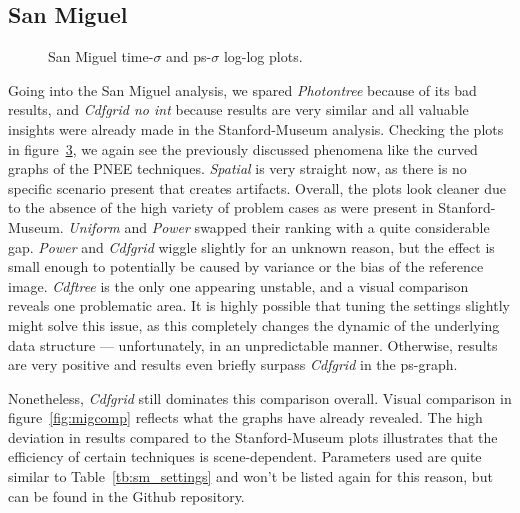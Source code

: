\FloatBarrier
\subsection{San Miguel}

\begin{figure}
    \centering
    \begin{subfigure}{.5\textwidth}
      \centering
        \caption{}
        \label{fig:sanmain_t}
    \end{subfigure}%
    \begin{subfigure}{.5\textwidth}
        \caption{}
        \label{fig:sanmain_ps}
    \end{subfigure}
    \caption{San Miguel time-$\sigma$ and ps-$\sigma$ log-log plots.}
    \label{fig:sanmain}
\end{figure}

Going into the San Miguel analysis, we spared \textit{Photontree} because of its bad results, and \textit{Cdfgrid no int} because results are very similar and all valuable insights were already made in the Stanford-Museum analysis. Checking the plots in figure~\ref{fig:sanmain}, we again see the previously discussed phenomena like the curved graphs of the PNEE techniques. \textit{Spatial} is very straight now, as there is no specific scenario present that creates artifacts. Overall, the plots look cleaner due to the absence of the high variety of problem cases as were present in Stanford-Museum. \textit{Uniform} and \textit{Power} swapped their ranking with a quite considerable gap. \textit{Power} and \textit{Cdfgrid} wiggle slightly for an unknown reason, but the effect is small enough to potentially be caused by variance or the bias of the reference image. \textit{Cdftree} is the only one appearing unstable, and a visual comparison reveals one problematic area. It is highly possible that tuning the settings slightly might solve this issue, as this completely changes the dynamic of the underlying data structure — unfortunately, in an unpredictable manner. Otherwise, results are very positive and results even briefly surpass \textit{Cdfgrid} in the ps-graph. 

Nonetheless, \textit{Cdfgrid} still dominates this comparison overall. Visual comparison in figure~\ref{fig:migcomp} reflects what the graphs have already revealed. The high deviation in results compared to the Stanford-Museum plots illustrates that the efficiency of certain techniques is scene-dependent. Parameters used are quite similar to Table~\ref{tb:sm_settings} and won't be listed again for this reason, but can be found in the Github repository.

